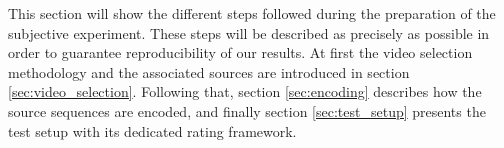 This section will show the different steps followed during the preparation of the subjective experiment. These steps will be described as precisely as possible in order to guarantee reproducibility of our results. 
At first the video selection methodology and the associated sources are introduced in section \ref{sec:video_selection}. Following that, section \ref{sec:encoding} describes how the source sequences are encoded, and finally section \ref{sec:test_setup} presents the test setup with its dedicated rating framework. 